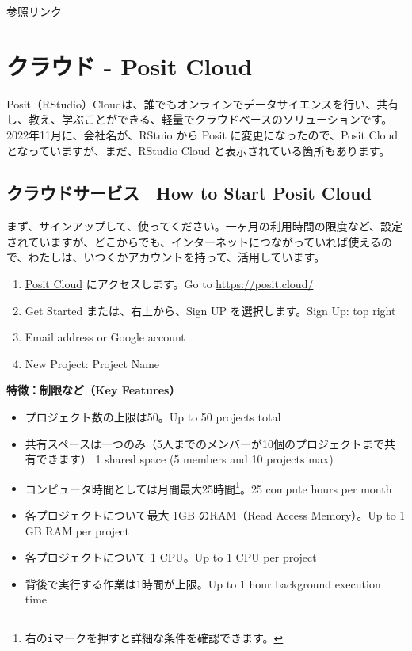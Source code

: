 \documentclass[
  xelatex, ja=standard]{bxjsbook}
\providecommand{\tightlist}{%
  \setlength{\itemsep}{0pt}\setlength{\parskip}{0pt}}
\theoremstyle{definition}
\theoremstyle{definition}
\theoremstyle{definition}
\theoremstyle{definition}
\theoremstyle{remark}
\begin{document}
\href{https://icu-hsuzuki.github.io/myds/techmemo.html\#windows-installation-of-r-rstudio-tex}{参照リンク}

\hypertarget{positcloud}{%
\section{クラウド - Posit Cloud}\label{positcloud}}

Posit（RStudio）Cloudは、誰でもオンラインでデータサイエンスを行い、共有し、教え、学ぶことができる、軽量でクラウドベースのソリューションです。2022年11月に、会社名が、RStuio から Posit に変更になったので、Posit Cloud となっていますが、まだ、RStudio Cloud と表示されている箇所もあります。

\hypertarget{ux30afux30e9ux30a6ux30c9ux30b5ux30fcux30d3ux30b9-how-to-start-posit-cloud}{%
\subsection{クラウドサービス　How to Start Posit Cloud}\label{ux30afux30e9ux30a6ux30c9ux30b5ux30fcux30d3ux30b9-how-to-start-posit-cloud}}

まず、サインアップして、使ってください。一ヶ月の利用時間の限度など、設定されていますが、どこからでも、インターネットにつながっていれば使えるので、わたしは、いつくかアカウントを持って、活用しています。

\begin{enumerate}
\def\labelenumi{\arabic{enumi}.}
\tightlist
\item
  \href{https://posit.cloud/}{Posit Cloud} にアクセスします。Go to \url{https://posit.cloud/}
\item
  Get Started または、右上から、Sign UP を選択します。Sign Up: top right
\item
  Email address or Google account
\item
  New Project: Project Name
\end{enumerate}

\textbf{特徴：制限など（Key Features）}

\begin{itemize}
\tightlist
\item
  プロジェクト数の上限は50。Up to 50 projects total
\item
  共有スペースは一つのみ（5人までのメンバーが10個のプロジェクトまで共有できます） 1 shared space (5 members and 10 projects max)
\item
  コンピュータ時間としては月間最大25時間\footnote{右の\texttt{i}マークを押すと詳細な条件を確認できます。}。25 compute hours per month
\item
  各プロジェクトについて最大 1GB のRAM（Read Access Memory）。Up to 1 GB RAM per project
\item
  各プロジェクトについて 1 CPU。Up to 1 CPU per project
\item
  背後で実行する作業は1時間が上限。Up to 1 hour background execution time
\end{itemize}
\end{document}
